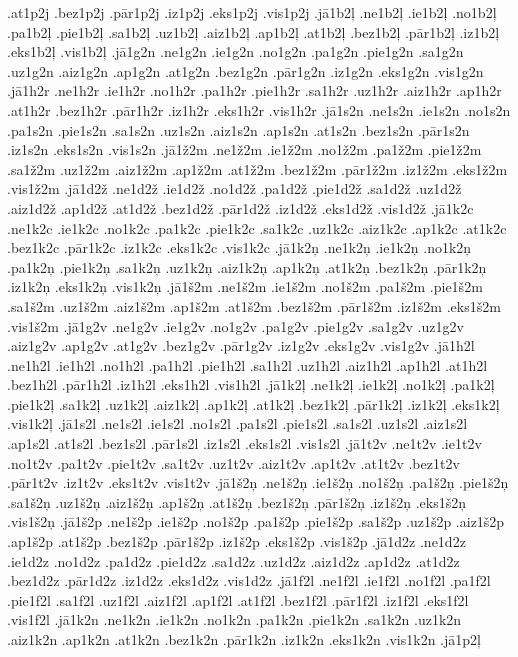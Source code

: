 {.at1p2j
.bez1p2j
.pār1p2j
.iz1p2j
.eks1p2j
.vis1p2j
.jā1b2ļ
.ne1b2ļ
.ie1b2ļ
.no1b2ļ
.pa1b2ļ
.pie1b2ļ
.sa1b2ļ
.uz1b2ļ
.aiz1b2ļ
.ap1b2ļ
.at1b2ļ
.bez1b2ļ
.pār1b2ļ
.iz1b2ļ
.eks1b2ļ
.vis1b2ļ
.jā1g2n
.ne1g2n
.ie1g2n
.no1g2n
.pa1g2n
.pie1g2n
.sa1g2n
.uz1g2n
.aiz1g2n
.ap1g2n
.at1g2n
.bez1g2n
.pār1g2n
.iz1g2n
.eks1g2n
.vis1g2n
.jā1h2r
.ne1h2r
.ie1h2r
.no1h2r
.pa1h2r
.pie1h2r
.sa1h2r
.uz1h2r
.aiz1h2r
.ap1h2r
.at1h2r
.bez1h2r
.pār1h2r
.iz1h2r
.eks1h2r
.vis1h2r
.jā1s2n
.ne1s2n
.ie1s2n
.no1s2n
.pa1s2n
.pie1s2n
.sa1s2n
.uz1s2n
.aiz1s2n
.ap1s2n
.at1s2n
.bez1s2n
.pār1s2n
.iz1s2n
.eks1s2n
.vis1s2n
.jā1ž2m
.ne1ž2m
.ie1ž2m
.no1ž2m
.pa1ž2m
.pie1ž2m
.sa1ž2m
.uz1ž2m
.aiz1ž2m
.ap1ž2m
.at1ž2m
.bez1ž2m
.pār1ž2m
.iz1ž2m
.eks1ž2m
.vis1ž2m
.jā1d2ž
.ne1d2ž
.ie1d2ž
.no1d2ž
.pa1d2ž
.pie1d2ž
.sa1d2ž
.uz1d2ž
.aiz1d2ž
.ap1d2ž
.at1d2ž
.bez1d2ž
.pār1d2ž
.iz1d2ž
.eks1d2ž
.vis1d2ž
.jā1k2c
.ne1k2c
.ie1k2c
.no1k2c
.pa1k2c
.pie1k2c
.sa1k2c
.uz1k2c
.aiz1k2c
.ap1k2c
.at1k2c
.bez1k2c
.pār1k2c
.iz1k2c
.eks1k2c
.vis1k2c
.jā1k2ņ
.ne1k2ņ
.ie1k2ņ
.no1k2ņ
.pa1k2ņ
.pie1k2ņ
.sa1k2ņ
.uz1k2ņ
.aiz1k2ņ
.ap1k2ņ
.at1k2ņ
.bez1k2ņ
.pār1k2ņ
.iz1k2ņ
.eks1k2ņ
.vis1k2ņ
.jā1š2m
.ne1š2m
.ie1š2m
.no1š2m
.pa1š2m
.pie1š2m
.sa1š2m
.uz1š2m
.aiz1š2m
.ap1š2m
.at1š2m
.bez1š2m
.pār1š2m
.iz1š2m
.eks1š2m
.vis1š2m
.jā1g2v
.ne1g2v
.ie1g2v
.no1g2v
.pa1g2v
.pie1g2v
.sa1g2v
.uz1g2v
.aiz1g2v
.ap1g2v
.at1g2v
.bez1g2v
.pār1g2v
.iz1g2v
.eks1g2v
.vis1g2v
.jā1h2l
.ne1h2l
.ie1h2l
.no1h2l
.pa1h2l
.pie1h2l
.sa1h2l
.uz1h2l
.aiz1h2l
.ap1h2l
.at1h2l
.bez1h2l
.pār1h2l
.iz1h2l
.eks1h2l
.vis1h2l
.jā1k2ļ
.ne1k2ļ
.ie1k2ļ
.no1k2ļ
.pa1k2ļ
.pie1k2ļ
.sa1k2ļ
.uz1k2ļ
.aiz1k2ļ
.ap1k2ļ
.at1k2ļ
.bez1k2ļ
.pār1k2ļ
.iz1k2ļ
.eks1k2ļ
.vis1k2ļ
.jā1s2l
.ne1s2l
.ie1s2l
.no1s2l
.pa1s2l
.pie1s2l
.sa1s2l
.uz1s2l
.aiz1s2l
.ap1s2l
.at1s2l
.bez1s2l
.pār1s2l
.iz1s2l
.eks1s2l
.vis1s2l
.jā1t2v
.ne1t2v
.ie1t2v
.no1t2v
.pa1t2v
.pie1t2v
.sa1t2v
.uz1t2v
.aiz1t2v
.ap1t2v
.at1t2v
.bez1t2v
.pār1t2v
.iz1t2v
.eks1t2v
.vis1t2v
.jā1š2ņ
.ne1š2ņ
.ie1š2ņ
.no1š2ņ
.pa1š2ņ
.pie1š2ņ
.sa1š2ņ
.uz1š2ņ
.aiz1š2ņ
.ap1š2ņ
.at1š2ņ
.bez1š2ņ
.pār1š2ņ
.iz1š2ņ
.eks1š2ņ
.vis1š2ņ
.jā1š2p
.ne1š2p
.ie1š2p
.no1š2p
.pa1š2p
.pie1š2p
.sa1š2p
.uz1š2p
.aiz1š2p
.ap1š2p
.at1š2p
.bez1š2p
.pār1š2p
.iz1š2p
.eks1š2p
.vis1š2p
.jā1d2z
.ne1d2z
.ie1d2z
.no1d2z
.pa1d2z
.pie1d2z
.sa1d2z
.uz1d2z
.aiz1d2z
.ap1d2z
.at1d2z
.bez1d2z
.pār1d2z
.iz1d2z
.eks1d2z
.vis1d2z
.jā1f2l
.ne1f2l
.ie1f2l
.no1f2l
.pa1f2l
.pie1f2l
.sa1f2l
.uz1f2l
.aiz1f2l
.ap1f2l
.at1f2l
.bez1f2l
.pār1f2l
.iz1f2l
.eks1f2l
.vis1f2l
.jā1k2n
.ne1k2n
.ie1k2n
.no1k2n
.pa1k2n
.pie1k2n
.sa1k2n
.uz1k2n
.aiz1k2n
.ap1k2n
.at1k2n
.bez1k2n
.pār1k2n
.iz1k2n
.eks1k2n
.vis1k2n
.jā1p2ļ
}

